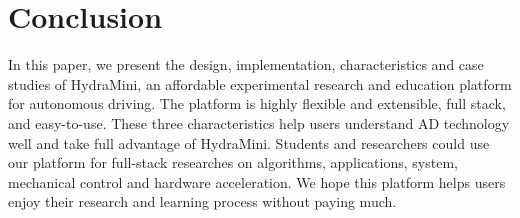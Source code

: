 \section{Conclusion}
In this paper, we present the design, implementation, characteristics and case studies of HydraMini, an affordable experimental research and education platform for autonomous driving. The platform is highly flexible and extensible, full stack, and easy-to-use. These three characteristics help users understand AD technology well and take full advantage of HydraMini. Students and researchers could use our platform for full-stack researches on algorithms, applications, system, mechanical control and hardware acceleration. We hope this platform helps users enjoy their research and learning process without paying much.